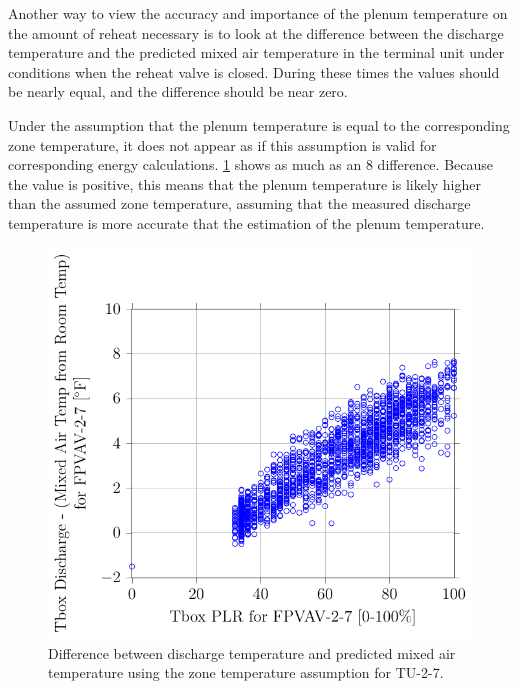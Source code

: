 Another way to view the accuracy and importance of the plenum
temperature on the amount of reheat necessary is to look at the
difference between the discharge temperature and the predicted mixed air
temperature in the terminal unit under conditions when the reheat valve
is closed.  During these times the values should be nearly equal, and the
difference should be near zero. 

Under the assumption that the plenum temperature is equal to the
corresponding zone temperature, it does not appear as if this assumption
is valid for corresponding energy calculations. \figref{}
\ref{fig:2017-01-09-1412-TboxDischargeMixedAirTempfromRoomTempforFPVAV27vsTboxPLRforFPVAV27}
shows as much as an \SI{8}{\degreeF} difference. Because the value is
positive, this means that the plenum temperature is likely higher than
the assumed zone temperature, assuming that the measured discharge
temperature is more accurate that the estimation of the plenum
temperature. 

\begin{figure}
\centering
\includegraphics[]{Plots/2017-01-09-1412-TboxDischargeMixedAirTempfromRoomTempforFPVAV27vsTboxPLRforFPVAV27.pdf}
\caption{Difference between discharge temperature and predicted mixed
air temperature using the zone temperature assumption for TU-2-7.}
\label{fig:2017-01-09-1412-TboxDischargeMixedAirTempfromRoomTempforFPVAV27vsTboxPLRforFPVAV27}
\end{figure}

